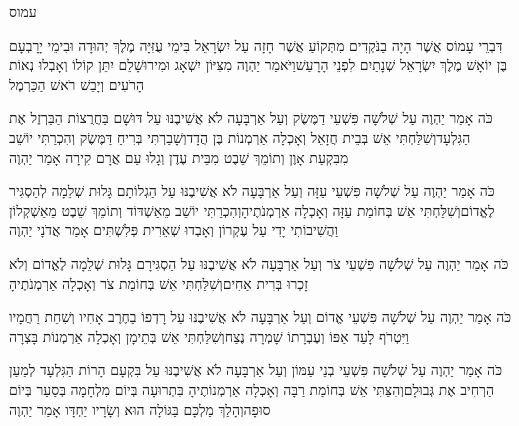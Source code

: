 \documentclass[../main/main.tex]{subfiles}
\begin{document}
\Incipit{}עמוס\par
\vspace{\afterchapskip}
\RTLmulticolcolumns
\begin{multicols}{\ncols}
דִּבְרֵי עָמוֹס אֲשֶׁר הָיָה בַנֹּקְדִים מִתְּקוֹעַ אֲשֶׁר חָזָה עַל יִשְׂרָאֵל בִּימֵי עֻזִּיָּה מֶלֶךְ יְהוּדָה וּבִימֵי יָרָבְעָם בֶּן יוֹאָשׁ מֶלֶךְ יִשְׂרָאֵל שְׁנָתַיִם לִפְנֵי הָרָעַשׁ\PreVerseSpace{}וַיֹּאמַר יַהְוֶה מִצִּיּוֹן יִשְׁאָג וּמִירוּשָׁלֵם יִתֵּן קוֹלוֹ וְאָבְלוּ נְאוֹת הָרֹעִים וְיָבֵשׁ רֹאשׁ הַכַּרְמֶל\OpenSection{}\par
{}כֹּה אָמַר יַהְוֶה עַל שְׁלֹשָׁה פִּשְׁעֵי דַמֶּשֶׂק וְעַל אַרְבָּעָה לֹא אֲשִׁיבֶנּוּ עַל דּוּשָׁם בַּחֲרֻצוֹת הַבַּרְזֶל אֶת הַגִּלְעָד\PreVerseSpace{}וְשִׁלַּחְתִּי אֵשׁ בְּבֵית חֲזָאֵל וְאָכְלָה אַרְמְנוֹת בֶּן הֲדָד\PreVerseSpace{}וְשָׁבַרְתִּי בְּרִיחַ דַּמֶּשֶׂק וְהִכְרַתִּי יוֹשֵׁב מִבִּקְעַת אָוֶן וְתוֹמֵךְ שֵׁבֶט מִבֵּית עֶדֶן וְגָלוּ עַם אֲרָם קִירָה אָמַר יַהְוֶה\OpenSection{}\par
{}כֹּה אָמַר יַהְוֶה עַל שְׁלֹשָׁה פִּשְׁעֵי עַזָּה וְעַל אַרְבָּעָה לֹא אֲשִׁיבֶנּוּ עַל הַגְלוֹתָם גָּלוּת שְׁלֵמָה לְהַסְגִּיר לֶאֱדוֹם\PreVerseSpace{}וְשִׁלַּחְתִּי אֵשׁ בְּחוֹמַת עַזָּה וְאָכְלָה אַרְמְנֹתֶיהָ\PreVerseSpace{}וְהִכְרַתִּי יוֹשֵׁב מֵאַשְׁדּוֹד וְתוֹמֵךְ שֵׁבֶט מֵאַשְׁקְלוֹן וַהֲשִׁיבוֹתִי יָדִי עַל עֶקְרוֹן וְאָבְדוּ שְׁאֵרִית פְּלִשְׁתִּים אָמַר אֲדֹנָי יַהְוֶה\OpenSection{}\par
{}כֹּה אָמַר יַהְוֶה עַל שְׁלֹשָׁה פִּשְׁעֵי צֹר וְעַל אַרְבָּעָה לֹא אֲשִׁיבֶנּוּ עַל הַסְגִּירָם גָּלוּת שְׁלֵמָה לֶאֱדוֹם וְלֹא זָכְרוּ בְּרִית אַחִים\PreVerseSpace{}וְשִׁלַּחְתִּי אֵשׁ בְּחוֹמַת צֹר וְאָכְלָה אַרְמְנֹתֶיהָ\OpenSection{}\par
{}כֹּה אָמַר יַהְוֶה עַל שְׁלֹשָׁה פִּשְׁעֵי אֱדוֹם וְעַל אַרְבָּעָה לֹא אֲשִׁיבֶנּוּ עַל רָדְפוֹ בַחֶרֶב אָחִיו וְשִׁחֵת רַחֲמָיו וַיִּטְרֹף לָעַד אַפּוֹ וְעֶבְרָתוֹ שָׁמְרָה\SubEnd{} נֶצַח\PreVerseSpace{}וְשִׁלַּחְתִּי אֵשׁ בְּתֵימָן וְאָכְלָה אַרְמְנוֹת בָּצְרָה\OpenSection{}\par
{}כֹּה אָמַר יַהְוֶה עַל שְׁלֹשָׁה פִּשְׁעֵי בְנֵי עַמּוֹן וְעַל אַרְבָּעָה לֹא אֲשִׁיבֶנּוּ עַל בִּקְעָם הָרוֹת הַגִּלְעָד לְמַעַן הַרְחִיב אֶת גְּבוּלָם\PreVerseSpace{}וְהִצַּתִּי אֵשׁ בְּחוֹמַת רַבָּה וְאָכְלָה אַרְמְנוֹתֶיהָ בִּתְרוּעָה בְּיוֹם מִלְחָמָה בְּסַעַר בְּיוֹם סוּפָה\PreVerseSpace{}וְהָלַךְ מַלְכָּם בַּגּוֹלָה הוּא וְשָׂרָיו יַחְדָּו אָמַר יַהְוֶה\OpenSection{}\par

\end{multicols}
\end{document}
